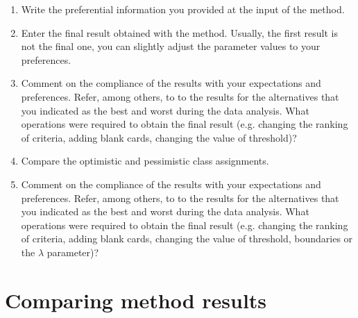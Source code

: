 \documentclass{article}
\begin{document}
\begin{enumerate}

    \item Write the preferential information you provided at the input of the method.

    \item Enter the final result obtained with the method. Usually, the first result is not the final one, you can
    slightly adjust the parameter values to your preferences.

    \item Comment on the compliance of the results with your expectations and preferences. Refer, among
    others, to to the results for the alternatives that you indicated as the best and worst during the data
    analysis. What operations were required to obtain the final result (e.g. changing the ranking of criteria,
    adding blank cards, changing the value of threshold)?

    \item Compare the optimistic and pessimistic class assignments.

    \item Comment on the compliance of the results with your expectations and preferences. Refer, among
    others, to to the results for the alternatives that you indicated as the best and worst during the data
    analysis. What operations were required to obtain the final result (e.g. changing the ranking of criteria,
    adding blank cards, changing the value of threshold, boundaries or the $\lambda$ parameter)?

\end{enumerate}

\section{Comparing method results}
\end{document}
